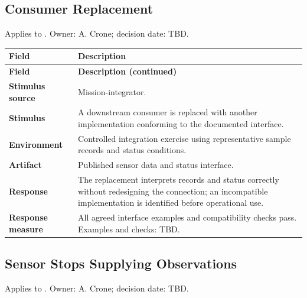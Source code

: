 \subsection{Consumer Replacement}
Applies to . Owner: A. Crone; decision date: TBD.

\begin{tabularx}{\linewidth}{L{3.5cm}Y}
\caption{Consumer Replacement\label{Table:SP800Quality2}}\\
\toprule
\textbf{Field} & \textbf{Description}\\\midrule\endfirsthead
\textbf{Field} & \textbf{Description (continued)}\\\midrule\endhead
\bottomrule\endlastfoot
\textbf{Stimulus source} & Mission-integrator.\\
\textbf{Stimulus} & A downstream consumer is replaced with another implementation conforming to the documented interface.\\
\textbf{Environment} & Controlled integration exercise using representative sample records and status conditions.\\
\textbf{Artifact} & Published sensor data and status interface.\\
\textbf{Response} & The replacement interprets records and status correctly without redesigning the connection; an incompatible implementation is identified before operational use.\\
\textbf{Response measure} & All agreed interface examples and compatibility checks pass. Examples and checks: TBD.\\
\end{tabularx}
\subsection{Sensor Stops Supplying Observations}
Applies to . Owner: A. Crone; decision date: TBD.

